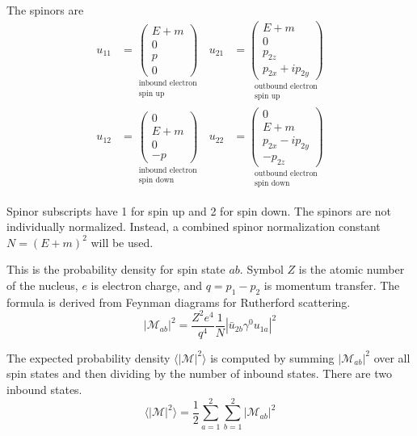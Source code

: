\documentclass[12pt]{article}
\begin{document}
\bigskip
The spinors are
\begin{align*}
u_{11}&=
\underset{\substack{\text{inbound electron}\\\text{spin up}}}
{
\begin{pmatrix}E+m\\0\\p\\0\end{pmatrix}
}
&
u_{21}&=
\underset{\substack{\text{outbound electron}\\\text{spin up}}}
{
\begin{pmatrix}E+m\\0\\p_{2z}\\p_{2x}+ip_{2y}\end{pmatrix}
}
\\[1ex]
u_{12}&=
\underset{\substack{\text{inbound electron}\\\text{spin down}}}
{
\begin{pmatrix}0\\E+m\\0\\-p\end{pmatrix}
}
&
u_{22}&=
\underset{\substack{\text{outbound electron}\\\text{spin down}}}
{
\begin{pmatrix}0\\E+m\\p_{2x}-ip_{2y}\\-p_{2z}\end{pmatrix}
}
\end{align*}

Spinor subscripts have 1 for spin up and 2 for spin down.
The spinors are not individually normalized.
Instead, a combined spinor normalization constant $N=(E+m)^2$ will be used.

\bigskip
This is the probability density for spin state $ab$.
Symbol $Z$ is the atomic number of the nucleus,
$e$ is electron charge,
and $q=p_1-p_2$ is momentum transfer.
The formula is derived from Feynman diagrams for Rutherford scattering.
\begin{equation*}
|\mathcal{M}_{ab}|^2=\frac{Z^2e^4}{q^4}\frac{1}{N}\left|\bar{u}_{2b}\gamma^0 u_{1a}\right|^2
\end{equation*}

The expected probability density
$\langle\vert\mathcal{M}\vert^2\rangle$
is computed by summing $|\mathcal{M}_{ab}|^2$
over all spin states and then dividing by the number of inbound states.
There are two inbound states.
\begin{equation*}
\langle\vert\mathcal{M}\vert^2\rangle
=\frac{1}{2}\sum_{a=1}^2\sum_{b=1}^2\left|\mathcal{M}_{ab}\right|^2
\end{equation*}
\end{document}
